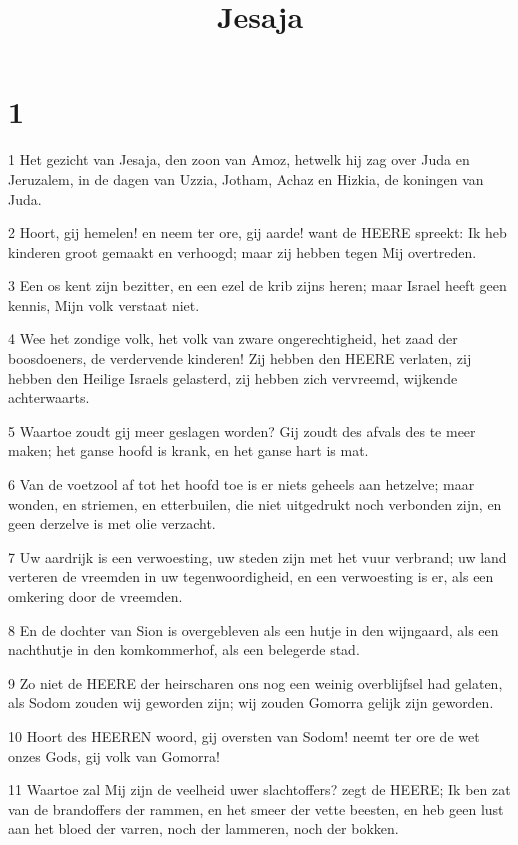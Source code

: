 

\title{Jesaja}



\chapter{1}

\par 1 Het gezicht van Jesaja, den zoon van Amoz, hetwelk hij zag over Juda en Jeruzalem, in de dagen van Uzzia, Jotham, Achaz en Hizkia, de koningen van Juda.
\par 2 Hoort, gij hemelen! en neem ter ore, gij aarde! want de HEERE spreekt: Ik heb kinderen groot gemaakt en verhoogd; maar zij hebben tegen Mij overtreden.
\par 3 Een os kent zijn bezitter, en een ezel de krib zijns heren; maar Israel heeft geen kennis, Mijn volk verstaat niet.
\par 4 Wee het zondige volk, het volk van zware ongerechtigheid, het zaad der boosdoeners, de verdervende kinderen! Zij hebben den HEERE verlaten, zij hebben den Heilige Israels gelasterd, zij hebben zich vervreemd, wijkende achterwaarts.
\par 5 Waartoe zoudt gij meer geslagen worden? Gij zoudt des afvals des te meer maken; het ganse hoofd is krank, en het ganse hart is mat.
\par 6 Van de voetzool af tot het hoofd toe is er niets geheels aan hetzelve; maar wonden, en striemen, en etterbuilen, die niet uitgedrukt noch verbonden zijn, en geen derzelve is met olie verzacht.
\par 7 Uw aardrijk is een verwoesting, uw steden zijn met het vuur verbrand; uw land verteren de vreemden in uw tegenwoordigheid, en een verwoesting is er, als een omkering door de vreemden.
\par 8 En de dochter van Sion is overgebleven als een hutje in den wijngaard, als een nachthutje in den komkommerhof, als een belegerde stad.
\par 9 Zo niet de HEERE der heirscharen ons nog een weinig overblijfsel had gelaten, als Sodom zouden wij geworden zijn; wij zouden Gomorra gelijk zijn geworden.
\par 10 Hoort des HEEREN woord, gij oversten van Sodom! neemt ter ore de wet onzes Gods, gij volk van Gomorra!
\par 11 Waartoe zal Mij zijn de veelheid uwer slachtoffers? zegt de HEERE; Ik ben zat van de brandoffers der rammen, en het smeer der vette beesten, en heb geen lust aan het bloed der varren, noch der lammeren, noch der bokken.
